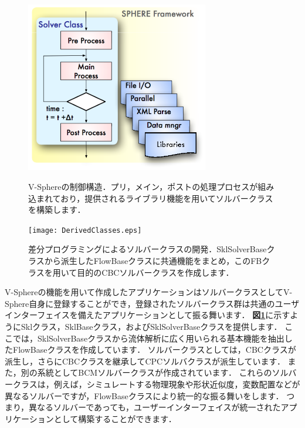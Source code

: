 \begin{figure}[htbp]
\begin{minipage}{.47\textwidth}
\begin{center}
\includegraphics[width=8cm,clip]{Sphere_Control.eps}
\end{center}
\caption{V-Sphereの制御構造．プリ，メイン，ポストの処理プロセスが組み込まれており，提供されるライブラリ機能を用いてソルバークラスを構築します．}
\label{fig:Control structure}
\end{minipage} \hfill
\begin{minipage}{.47\textwidth}
\begin{center}
\texttt{[image: DerivedClasses.eps]}
\end{center}
\caption{差分プログラミングによるソルバークラスの開発．SklSolverBaseクラスから派生したFlowBaseクラスに共通機能をまとめ，このFBクラスを用いて目的のCBCソルバークラスを作成します．}
\label{fig:DerivedSolvers}
\end{minipage}
\end{figure}


V-Sphereの機能を用いて作成したアプリケーションはソルバークラスとしてV-Sphere自身に登録することができ，登録されたソルバークラス群は共通のユーザインターフェイスを備えたアプリケーションとして振る舞います．
\textbf{図\ref{fig:DerivedSolvers}}に示すようにSklクラス，SklBaseクラス，およびSklSolverBaseクラスを提供します．
ここでは，SklSolverBaseクラスから流体解析に広く用いられる基本機能を抽出したFlowBaseクラスを作成しています．
ソルバークラスとしては，CBCクラスが派生し，さらにCBCクラスを継承してCPCソルバクラスが派生しています．
また，別の系統としてBCMソルバークラスが作成されています．
これらのソルバークラスは，例えば，シミュレートする物理現象や形状近似度，変数配置などが異なるソルバーですが，FlowBaseクラスにより統一的な振る舞いをします．
つまり，異なるソルバーであっても，ユーザーインターフェイスが統一されたアプリケーションとして構築することができます．


